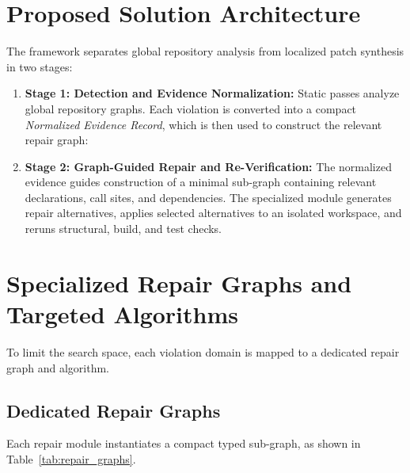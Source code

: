 \documentclass[10pt,a4paper]{article}
\begin{document}
\section{Proposed Solution Architecture}
The framework separates global repository analysis from localized patch synthesis in two stages:
\begin{enumerate}[leftmargin=1.4em]
  \item \textbf{Stage 1: Detection and Evidence Normalization:} Static passes analyze global repository graphs. Each violation is converted into a compact \emph{Normalized Evidence Record}, which is then used to construct the relevant repair graph:
  \begin{center}
  \vspace{-2pt}
  \vspace{-2pt}
  \end{center}
  \item \textbf{Stage 2: Graph-Guided Repair and Re-Verification:} The normalized evidence guides construction of a minimal sub-graph containing relevant declarations, call sites, and dependencies. The specialized module generates repair alternatives, applies selected alternatives to an isolated workspace, and reruns structural, build, and test checks.
\end{enumerate}

\section{Specialized Repair Graphs and Targeted Algorithms}
To limit the search space, each violation domain is mapped to a dedicated repair graph and algorithm.

\subsection{Dedicated Repair Graphs}
Each repair module instantiates a compact typed sub-graph, as shown in Table~\ref{tab:repair_graphs}.
\end{document}
